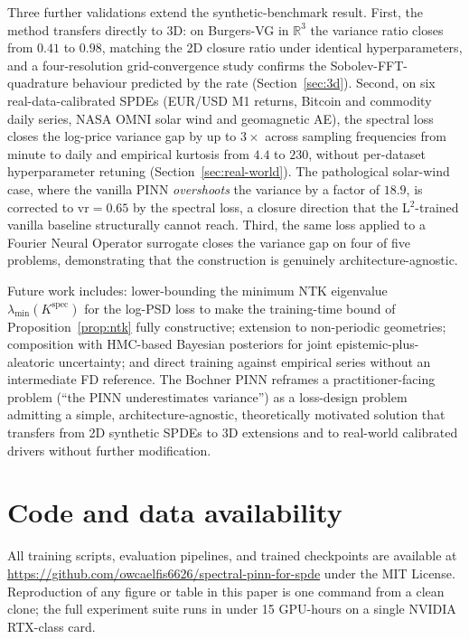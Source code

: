 \documentclass[review,12pt]{elsarticle}
\begin{document}
Three further validations extend the synthetic-benchmark result.
First, the method transfers directly to 3D: on Burgers-VG in
\(\mathbb R^3\) the variance ratio closes from \(0.41\) to \(0.98\),
matching the 2D closure ratio under identical hyperparameters, and a
four-resolution grid-convergence study confirms the
Sobolev-FFT-quadrature behaviour predicted by the rate
(Section~\ref{sec:3d}). Second, on six real-data-calibrated SPDEs
(EUR/USD M1 returns, Bitcoin and commodity daily series, NASA OMNI
solar wind and geomagnetic AE), the spectral loss closes the
log-price variance gap by up to \(3\times\) across sampling
frequencies from minute to daily and empirical kurtosis from \(4.4\)
to \(230\), without per-dataset hyperparameter retuning
(Section~\ref{sec:real-world}). The pathological solar-wind case,
where the vanilla PINN \emph{overshoots} the variance by a factor of
\(18.9\), is corrected to \(\mathrm{vr} = 0.65\) by the spectral
loss, a closure direction that the L\(^2\)-trained vanilla
baseline structurally cannot reach. Third, the same loss applied to
a Fourier Neural Operator surrogate closes the variance gap on four
of five problems, demonstrating that the construction is genuinely
architecture-agnostic.

Future work includes: lower-bounding the minimum NTK eigenvalue
$\lambda_{\min}(K^{\mathrm{spec}})$ for the log-PSD loss to make the
training-time bound of Proposition~\ref{prop:ntk} fully constructive;
extension to non-periodic geometries; composition with HMC-based
Bayesian posteriors for joint epistemic-plus-aleatoric uncertainty;
and direct training against empirical series without an intermediate FD
reference. The Bochner PINN reframes a practitioner-facing problem
(``the PINN underestimates variance'') as a loss-design problem
admitting a simple, architecture-agnostic, theoretically motivated
solution that transfers from 2D synthetic SPDEs to 3D extensions and
to real-world calibrated drivers without further modification.

\section*{Code and data availability}

All training scripts, evaluation pipelines, and trained checkpoints
are available at
\url{https://github.com/owcaelfis6626/spectral-pinn-for-spde} under the
MIT License. Reproduction of any figure or table in this paper is
one command from a clean clone; the full experiment suite runs in
under 15 GPU-hours on a single NVIDIA RTX-class card.
\end{document}
